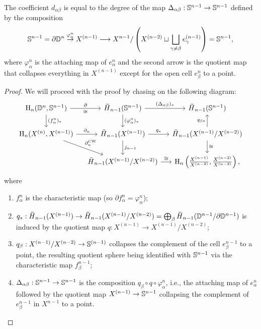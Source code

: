 \begin{thm}
    The coefficient $d_{\alpha\beta}$ is equal to the degree of the map $\Delta_{\alpha\beta}:\mathbb{S}^{n-1}\to \mathbb{S}^{n-1}$ defined by the composition
    \[\mathbb{S}^{n-1}=\partial \mathbb{D}^n\overset{\varphi_\alpha^n}{\to}X^{(n-1)}\longrightarrow X^{n-1}\slash\left(X^{(n-2)}\sqcup \bigsqcup_{\gamma\neq\beta}e_\gamma^{(n-1)}\right)=\mathbb{S}^{n-1},\]
    where $\varphi_\alpha^n$ is the attaching map of $e^n_\alpha$ and the second arrow is the quotient map that collapses everything in $X^{(n-1)}$ except for the open cell $e^n_\beta$ to a point.
\end{thm}
\begin{proof}
    We will proceed with the proof by chasing on the following diagram:
    \[
    \begin{tikzcd}[column sep=small] 
    \rmH_n(\bbD^n,\bbS^{n-1})\arrow[r,"\partial","\cong"']\arrow[d,"(f^n_\alpha)_\ast"]& \wt{H}_{n-1}(\bbS^{n-1})\arrow[r,"(\Delta_{\alpha\beta})_\ast"]\arrow[d,"(\varphi^n_\alpha)_\ast"]& \wt{H}_{n-1}(\bbS^{n-1})\\
    \rmH_n(X^{(n)},X^{(n-1)})\arrow[r,"\partial_n"]\arrow[dr,"\partial_n^{\mathrm{CW}}"]& \wt{H}_{n-1}(X^{(n-1)})\arrow[r,"q_\ast"]\arrow[d,"j_{n-1}"]&\wt{H}_{n-1}(X^{(n-1)}\slash X^{(n-2)})\arrow[d,"\cong"]\arrow[u,"q_{\beta\ast}"]\\
    & \wt{H}_{n-1}(X^{(n-1)}\slash X^{(n-2)})\arrow[r,"\cong"]& \rmH_n\left(\frac{X^{(n-1)}}{X^{(n-2)}},\frac{X^{(n-2)}}{X^{(n-2)}}\right),
    \end{tikzcd}
    \]
    where 
    \begin{enumerate}
         \item $f_\alpha^n$ is the characteristic map (so $\partial f_\alpha^n=\varphi_\alpha^n$); 
         \item $q_\ast:\wt{H}_{n-1}(X^{(n-1)})\to \wt{H}_{n-1}(X^{(n-1)}\slash X^{(n-2)})=\bigoplus_\beta \wt{H}_{n-1}(\bbD^{n-1}\slash \partial \bbD^{n-1})$ is induced by the quotient map $q:X^{(n-1)}\to X^{(n-1)}\slash X^{(n-2)}$; 
         \item $q_\beta:X^{(n-1)}\slash X^{(n-2)}\to \mathbb{S}^{(n-1)}$ collapses the complement of the cell $e^{n-1}_\beta$ to a point, the resulting quotient sphere being identified with $\mathbb{S}^{n-1}$ via the characteristic map $f^{n-1}_\beta$;
         \item $\Delta_{\alpha\beta}:\mathbb{S}^{n-1}\to \mathbb{S}^{n-1}$ is the composition $q_\beta\circ q\circ \varphi^n_\alpha$, i.e., the attaching map of $e^n_\alpha$ followed by the quotient map $X^{(n-1)}\to \mathbb{S}^{n-1}$ collapsing the complement of $e^{n-1}_\beta$ in $X^{n-1}$ to a point.

\end{enumerate}
\end{proof}
